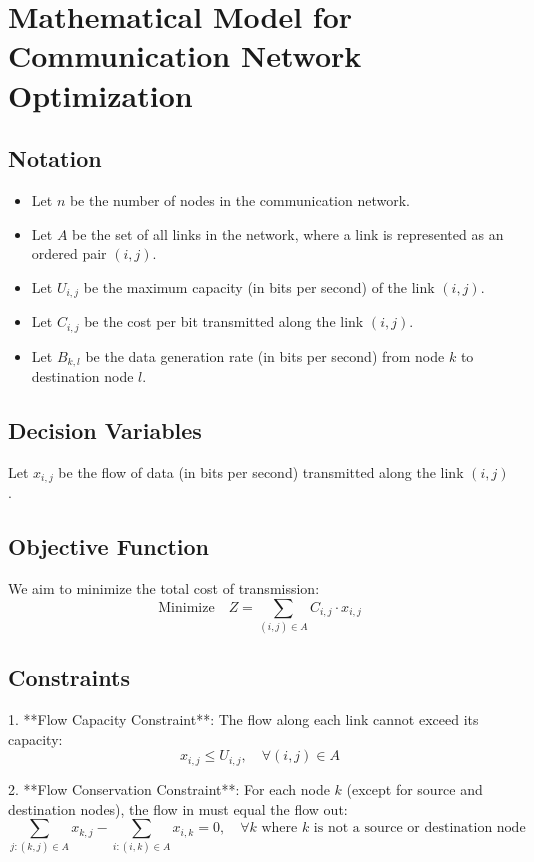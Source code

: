 \documentclass{article}
\begin{document}
\section*{Mathematical Model for Communication Network Optimization}

\subsection*{Notation}
\begin{itemize}
    \item Let \( n \) be the number of nodes in the communication network.
    \item Let \( A \) be the set of all links in the network, where a link is represented as an ordered pair \( (i, j) \).
    \item Let \( U_{i,j} \) be the maximum capacity (in bits per second) of the link \( (i, j) \).
    \item Let \( C_{i,j} \) be the cost per bit transmitted along the link \( (i, j) \).
    \item Let \( B_{k,l} \) be the data generation rate (in bits per second) from node \( k \) to destination node \( l \).
\end{itemize}

\subsection*{Decision Variables}
Let \( x_{i,j} \) be the flow of data (in bits per second) transmitted along the link \( (i, j) \).

\subsection*{Objective Function}
We aim to minimize the total cost of transmission:
\[
\text{Minimize} \quad Z = \sum_{(i,j) \in A} C_{i,j} \cdot x_{i,j}
\]

\subsection*{Constraints}
1. **Flow Capacity Constraint**: The flow along each link cannot exceed its capacity:
   \[
   x_{i,j} \leq U_{i,j}, \quad \forall (i,j) \in A
   \]

2. **Flow Conservation Constraint**: For each node \( k \) (except for source and destination nodes), the flow in must equal the flow out:
   \[
   \sum_{j: (k,j) \in A} x_{k,j} - \sum_{i: (i,k) \in A} x_{i,k} = 0, \quad \forall k \text{ where } k \text{ is not a source or destination node}
   \]
\end{document}
